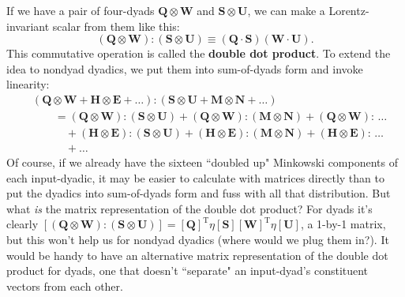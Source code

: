 \documentclass[12pt]{article}
\renewcommand{\vv}[1]{\mathbf{#1}}
\begin{document}
If we have a pair of four-dyads $\vv Q \otimes \vv W$ and $\vv S \otimes \vv U$, we can make a Lorentz-invariant scalar from them like this:
\begin{equation}\label{eq:ddp1}
(\vv Q \otimes \vv W) : (\vv S \otimes \vv U) \equiv (\vv Q \cdot \vv S) (\vv W \cdot \vv U).
\end{equation}
This commutative operation is called the \textbf{double dot product}. To extend the idea to nondyad dyadics, we put them into sum-of-dyads form and invoke linearity:
\begin{equation*}
\begin{aligned}
&(\vv Q \otimes \vv W + \vv H \otimes \vv E + \dots) : (\vv S \otimes \vv U + \vv M \otimes \vv N + \dots) \\[3pt]
&\qquad = (\vv Q \otimes \vv W) : (\vv S \otimes \vv U) + (\vv Q \otimes \vv W) : (\vv M \otimes \vv N) + (\vv Q \otimes \vv W) : \, \dots \\
& \qquad \quad + (\vv H \otimes \vv E) : (\vv S \otimes \vv U) + (\vv H \otimes \vv E) : (\vv M \otimes \vv N) + (\vv H \otimes \vv E) : \, \dots \\
& \qquad \quad + \dots
\end{aligned}
\end{equation*}
Of course, if we already have the sixteen ``doubled up" Minkowski components of each input-dyadic, it may be easier to calculate with matrices directly than to put the dyadics into sum-of-dyads form and fuss with all that distribution. But what \emph{is} the matrix representation of the double dot product? For dyads it's clearly $[ (\vv Q \otimes \vv W) : (\vv S \otimes \vv U) ] = [\vv Q]^{\mathrm{T}} \eta [\vv S] [\vv W]^{\mathrm{T}} \eta [\vv U]$, a 1-by-1 matrix, but this won't help us for nondyad dyadics (where would we plug them in?). It would be handy to have an alternative matrix representation of the double dot product for dyads, one that doesn't ``separate" an input-dyad's constituent vectors from each other.
\end{document}
